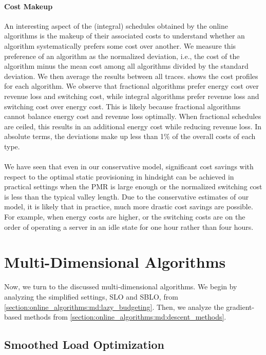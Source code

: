 \paragraph{Cost Makeup} An interesting aspect of the (integral) schedules obtained by the online algorithms is the makeup of their associated costs to understand whether an algorithm systematically prefers some cost over another. We measure this preference of an algorithm as the normalized deviation, i.e., the cost of the algorithm minus the mean cost among all algorithms divided by the standard deviation. We then average the results between all traces.  shows the cost profiles for each algorithm. We observe that fractional algorithms prefer energy cost over revenue loss and switching cost, while integral algorithms prefer revenue loss and switching cost over energy cost. This is likely because fractional algorithms cannot balance energy cost and revenue loss optimally. When fractional schedules are ceiled, this results in an additional energy cost while reducing revenue loss. In absolute terms, the deviations make up less than 1\% of the overall costs of each type.

\paragraph{} We have seen that even in our conservative model, significant cost savings with respect to the optimal static provisioning in hindsight can be achieved in practical settings when the PMR is large enough or the normalized switching cost is less than the typical valley length. Due to the conservative estimates of our model, it is likely that in practice, much more drastic cost savings are possible. For example, when energy costs are higher, or the switching costs are on the order of operating a server in an idle state for one hour rather than four hours.

\section{Multi-Dimensional Algorithms}

Now, we turn to the discussed multi-dimensional algorithms. We begin by analyzing the simplified settings, SLO and SBLO, from \cref{section:online_algorithms:md:lazy_budgeting}. Then, we analyze the gradient-based methods from \cref{section:online_algorithms:md:descent_methods}.

\subsection{Smoothed Load Optimization}

